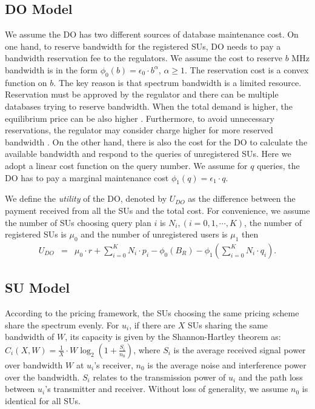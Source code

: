 \documentclass[journal]{IEEEtran}
\begin{document}
\subsection{DO Model}
\label{subsec:DO}

We assume the DO has two different sources of database maintenance cost. On one hand, to reserve bandwidth for the registered SUs, DO needs to pay a bandwidth reservation fee to the regulators. We assume the cost to reserve $b$ MHz bandwidth is in the form $\phi_0(b)=\epsilon_0\cdot b^{\alpha}$, $\alpha\geq 1$. The reservation cost is a convex function on $b$. The key reason is that spectrum bandwidth is a limited resource. Reservation must be approved by the regulator and there can be multiple databases trying to reserve bandwidth. When the total demand is higher, the equilibrium price can be also higher \cite{reservation_price}. Furthermore, to avoid unnecessary reservations, the regulator may consider charge higher for more reserved bandwidth \cite{ReserveOfcom}. On the other hand, there is also the cost for the DO to calculate the available bandwidth and respond to the queries of unregistered SUs. Here we adopt a linear cost function on the query number. We assume for $q$ queries, the DO has to pay a marginal maintenance cost $\phi_1(q)=\epsilon_1\cdot q$.

We define the \emph{utility} of the DO, denoted by $U_{DO}$ as the difference between the payment received from all the SUs and the total cost. For convenience, we assume the number of SUs choosing query plan $i$ is $N_i, (i=0, 1, \cdots, K)$, the number of registered SUs is $\mu_0$ and the number of unregistered users is $\mu_1$ then
\begin{eqnarray}
\label{eqn:u_do}
U_{DO}&=&\mu_0\cdot r+\sum_{i=0}^K N_i\cdot p_i-\phi_0(B_R)-\phi_1(\sum_{i=0}^K N_i\cdot q_i).
\end{eqnarray}

\subsection{SU Model}
\label{subsec:SU}

According to the pricing framework, the SUs choosing the same pricing scheme share the spectrum evenly. For $u_i$, if there are $X$ SUs sharing the same bandwidth of $W$, its capacity is given by the Shannon-Hartley theorem as:
$
C_i(X, W)=\frac{1}{X}\cdot W\log_2\left(1+\frac{S_i}{n_0}\right)
$, where $S_i$ is the average received signal power over bandwidth $W$ at $u_i$'s receiver, $n_0$ is the average noise and interference power over the bandwidth. $S_i$ relates to the transmission power of $u_i$ and the path loss between $u_i$'s transmitter and receiver. Without loss of generality, we assume $n_0$ is identical for all SUs.
\end{document}
